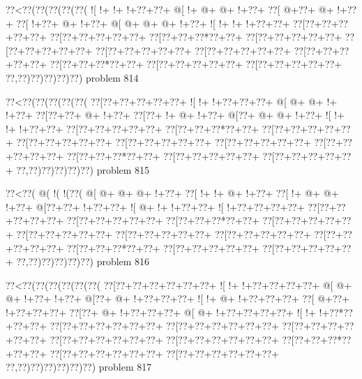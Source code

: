\vbox{\vbox{\goo
\0??<\0??(\0??(\0??(\0??(\0??(
\- ![\- !+\- !+\- !+\0??+\0??+
\- @[\- !+\- @+\- @+\- !+\0??+
\0??[\- @+\0??+\- @+\- !+\0??+
\0??[\- !+\0??+\- @+\- !+\0??+
\- @[\- @+\- @+\- @+\- !+\0??+
\- ![\- !+\- !+\- !+\0??+\0??+
\0??[\0??+\0??+\0??+\0??+\0??+
\0??[\0??+\0??+\0??+\0??+\0??+
\0??[\0??+\0??+\0??*\0??+\0??+
\0??[\0??+\0??+\0??+\0??+\0??+
\0??[\0??+\0??+\0??+\0??+\0??+
\0??[\0??+\0??+\0??+\0??+\0??+
\0??[\0??+\0??+\0??+\0??+\0??+
\0??[\0??+\0??+\0??+\0??+\0??+
\0??[\0??+\0??+\0??*\0??+\0??+
\0??[\0??+\0??+\0??+\0??+\0??+
\0??[\0??+\0??+\0??+\0??+\0??+
\0??,\0??)\0??)\0??)\0??)\0??)
}
\hfil problem 814\hfil\break
}

\vbox{\vbox{\goo
\0??<\0??(\0??(\0??(\0??(\0??(
\0??[\0??+\0??+\0??+\0??+\0??+
\- ![\- !+\- !+\0??+\0??+\0??+
\- @[\- @+\- @+\- !+\- !+\0??+
\0??[\0??+\0??+\- @+\- !+\0??+
\0??[\0??+\- !+\- @+\- !+\0??+
\- @[\0??+\- @+\- @+\- !+\0??+
\- ![\- !+\- !+\- !+\0??+\0??+
\0??[\0??+\0??+\0??+\0??+\0??+
\0??[\0??+\0??+\0??*\0??+\0??+
\0??[\0??+\0??+\0??+\0??+\0??+
\0??[\0??+\0??+\0??+\0??+\0??+
\0??[\0??+\0??+\0??+\0??+\0??+
\0??[\0??+\0??+\0??+\0??+\0??+
\0??[\0??+\0??+\0??+\0??+\0??+
\0??[\0??+\0??+\0??*\0??+\0??+
\0??[\0??+\0??+\0??+\0??+\0??+
\0??[\0??+\0??+\0??+\0??+\0??+
\0??,\0??)\0??)\0??)\0??)\0??)
}
\hfil problem 815\hfil\break
}

\vbox{\vbox{\goo
\0??<\0??(\- @(\- !(\- !(\0??(
\- @[\- @+\- @+\- @+\- !+\0??+
\0??[\- !+\- !+\- @+\- !+\0??+
\0??[\- !+\- @+\- @+\- !+\0??+
\- @[\0??+\0??+\- !+\0??+\0??+
\- ![\- @+\- !+\- !+\0??+\0??+
\- ![\- !+\0??+\0??+\0??+\0??+
\0??[\0??+\0??+\0??+\0??+\0??+
\0??[\0??+\0??+\0??+\0??+\0??+
\0??[\0??+\0??+\0??*\0??+\0??+
\0??[\0??+\0??+\0??+\0??+\0??+
\0??[\0??+\0??+\0??+\0??+\0??+
\0??[\0??+\0??+\0??+\0??+\0??+
\0??[\0??+\0??+\0??+\0??+\0??+
\0??[\0??+\0??+\0??+\0??+\0??+
\0??[\0??+\0??+\0??*\0??+\0??+
\0??[\0??+\0??+\0??+\0??+\0??+
\0??[\0??+\0??+\0??+\0??+\0??+
\0??,\0??)\0??)\0??)\0??)\0??)
}
\hfil problem 816\hfil\break
}

\vbox{\vbox{\goo
\0??<\0??(\0??(\0??(\0??(\0??(\0??(
\0??[\0??+\0??+\0??+\0??+\0??+\0??+
\- ![\- !+\- !+\0??+\0??+\0??+\0??+
\- @[\- @+\- @+\- !+\0??+\- !+\0??+
\- @[\0??+\- @+\- !+\0??+\0??+\0??+
\- ![\- !+\- @+\- !+\0??+\0??+\0??+
\0??[\- @+\0??+\- !+\0??+\0??+\0??+
\0??[\0??+\- @+\- !+\0??+\0??+\0??+
\- @[\- @+\- !+\0??+\0??+\0??+\0??+
\- ![\- !+\- !+\0??*\0??+\0??+\0??+
\0??[\0??+\0??+\0??+\0??+\0??+\0??+
\0??[\0??+\0??+\0??+\0??+\0??+\0??+
\0??[\0??+\0??+\0??+\0??+\0??+\0??+
\0??[\0??+\0??+\0??+\0??+\0??+\0??+
\0??[\0??+\0??+\0??+\0??+\0??+\0??+
\0??[\0??+\0??+\0??*\0??+\0??+\0??+
\0??[\0??+\0??+\0??+\0??+\0??+\0??+
\0??[\0??+\0??+\0??+\0??+\0??+\0??+
\0??,\0??)\0??)\0??)\0??)\0??)\0??)
}
\hfil problem 817\hfil\break
}

